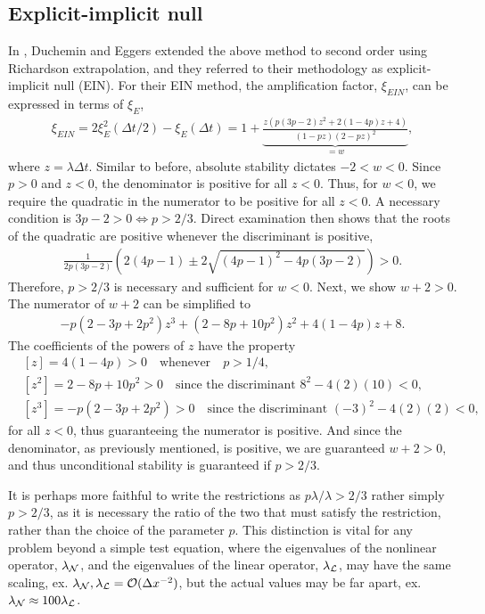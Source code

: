 \subsection{Explicit-implicit null}
In \cite{duchemin2014explicit}, Duchemin and Eggers extended the above method to second order using Richardson extrapolation, and they referred to their methodology as explicit-implicit null (EIN). For their EIN method, the amplification factor, $\xi_{EIN}$, can be expressed in terms of $\xi_E$, 
\begin{align}
\xi_{EIN} 
= 2\xi^2_{E}(\Delta t/2) - \xi_E(\Delta t) 
= 1 + \underbrace{\frac{z\left(p(3p-2)z^2 + 2(1-4p)z + 4 \right)}{(1 - pz)(2-pz)^2}}_{=w},
\end{align} 
where $z = \lambda\Delta t$. Similar to before, absolute stability dictates $-2 < w < 0$. Since $p>0$ and $z<0$, the denominator is positive for all $z<0$. Thus, for $w<0$, we require the quadratic in the numerator to be positive for all $z<0$. A necessary condition is $3p-2>0 \iff p>2/3$. Direct examination then shows that the roots of the quadratic are positive whenever the discriminant is positive,
\begin{align}
\frac{1}{2p(3p-2)}\left(2(4p-1) \pm  2\sqrt{(4p-1)^2 - 4p(3p-2)}\right) > 0.
\end{align} 
Therefore, $p>2/3$ is necessary and sufficient for $w<0$. Next, we show $w+2>0$. The numerator of $w+2$ can be simplified to 
\begin{align}
-p(2-3p+2p^2) z^3 + (2-8p+10p^2)z^2 + 4(1-4p)z + 8.
\end{align}
The coefficients of the powers of $z$ have the property
\begin{align*}
& [z] = 4(1-4p) > 0 \quad\text{whenever}\quad p > 1/4,
\\
&[z^2] = 2-8p + 10p^2 > 0 \quad\text{since the discriminant } 8^2 - 4(2)(10) < 0,
\\
&[z^3] = -p(2-3p+2p^2) > 0 \quad\text{since the discriminant } (-3)^2 - 4(2)(2) < 0,
\end{align*}
for all $z<0$, thus guaranteeing the numerator is positive. And since the denominator, as previously mentioned, is positive, we are guaranteed $w+2>0$, and thus unconditional stability is guaranteed if $p>2/3$.

\begin{remark}
	It is perhaps more faithful to write the restrictions as $p\lambda / \lambda > 2/3$ rather simply $p > 2/3$, as it is necessary the ratio of the two that must satisfy the restriction, rather than the choice of the parameter $p$. This distinction is vital for any problem beyond a simple test equation, where the eigenvalues of the nonlinear operator, $\lambda_{\mathcal{N}}$, and the eigenvalues of the linear operator, $\lambda_{\mathcal{L}}$, may have the same scaling, ex. $\lambda_{\mathcal{N}}, \lambda_{\mathcal{L}} = \mathcal{O}(\Delta x^{-2})$, but the actual values may be far apart, ex. $\lambda_{\mathcal{N}} \approx 100 \lambda_{\mathcal{L}}$.
\end{remark}

